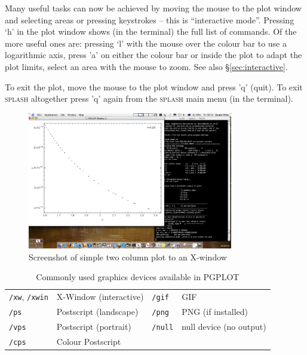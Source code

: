 \documentclass[a4paper,10pt]{article}
\newcommand{\splash}{\textsc{splash }}
\begin{document}
 Many useful tasks can now be achieved by moving the mouse to the plot window and selecting areas or pressing keystrokes -- this is ``interactive mode''. Pressing `h' in the plot window shows (in the terminal) the full list of commands. Of the more useful ones are: pressing `l' with the mouse over the colour bar to use a logarithmic axis, press 'a' on either the colour bar or inside the plot to adapt the plot limits, select an area with the mouse to zoom. See also \S\ref{sec:interactive}.

To exit the plot, move the mouse to the plot window and press 'q' (quit). To exit \splash altogether press 'q' again from the \splash main menu (in the terminal). 
\begin{figure}[ht]
\begin{center}
\includegraphics[width=0.8\textwidth]{rhoh.jpg}
\caption{Screenshot of simple two column plot to an X-window}
\label{fig:rhoh}
\end{center}
\end{figure}

\begin{table}[h]
\centering
\begin{tabular}{|l|l|l|l|}
\hline
\verb+/xw+, \verb+/xwin+ & X-Window (interactive) & \verb+/gif+ & GIF \\
\verb+/ps+ & Postscript (landscape) & \verb+/png+ & PNG (if installed) \\
\verb+/vps+ & Postscript (portrait) & \verb+/null+ & null device (no output) \\
\verb+/cps+ & Colour Postscript & & \\
\hline
\end{tabular}
\caption{Commonly used graphics devices available in PGPLOT}
\label{tab:devices}
\end{table}
\end{document}

